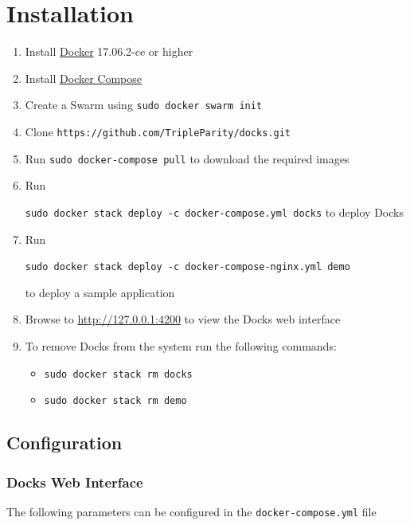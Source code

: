 \documentclass[]{article}
\providecommand{\tightlist}{%
	\setlength{\itemsep}{0pt}\setlength{\parskip}{0pt}}
\let\oldtexttt\texttt
\renewcommand{\texttt}[1]{
	\colorbox{Light}{\oldtexttt{#1}}
}
\begin{document}
\pagebreak

\section{Installation}

\begin{enumerate}
	\def\labelenumi{\arabic{enumi}.}
	\tightlist
	\item
	  Install \href{https://docs.docker.com/install/}{Docker} 17.06.2-ce or higher
	\item
	  Install \href{https://docs.docker.com/compose/install/}{Docker Compose}
	\item
	  Create a Swarm using \texttt{sudo\ docker\ swarm\ init}
	\item
	  Clone \texttt{https://github.com/TripleParity/docks.git}
	\item
	  Run \texttt{sudo\ docker-compose\ pull} to download the required
	  images
	\item
	  Run
	  \texttt{sudo\ docker\ stack\ deploy\ -c\ docker-compose.yml\ docks} to
	  deploy Docks
	\item
	  Run
	  \texttt{sudo\ docker\ stack\ deploy\ -c\ docker-compose-nginx.yml\ demo}
	  to deploy a sample application
	\item
	  Browse to \url{http://127.0.0.1:4200} to view the Docks web interface
	\item
	  To remove Docks from the system run the following commands:
	
	  \begin{itemize}
	  \tightlist
	  \item
		\texttt{sudo\ docker\ stack\ rm\ docks}
	  \item
		\texttt{sudo\ docker\ stack\ rm\ demo}
	  \end{itemize}
	\end{enumerate}

\subsection{Configuration}

\subsubsection{Docks Web Interface}
The following parameters can be configured in the \texttt{docker-compose.yml} file
\end{document}
